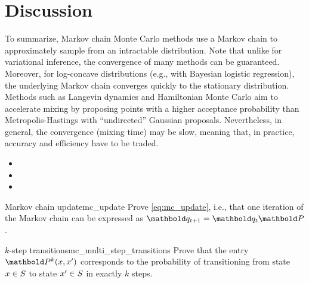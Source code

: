 \section*{Discussion}

To summarize, Markov chain Monte Carlo methods use a Markov chain to approximately sample from an intractable distribution.
Note that unlike for variational inference, the convergence of many methods can be guaranteed.
Moreover, for log-concave distributions (e.g., with Bayesian logistic regression), the underlying Markov chain converges quickly to the stationary distribution.
Methods such as Langevin dynamics and Hamiltonian Monte Carlo aim to accelerate mixing by proposing points with a higher acceptance probability than Metropolis-Hastings with ``undirected'' Gaussian proposals.
Nevertheless, in general, the convergence (mixing time) may be slow, meaning that, in practice, accuracy and efficiency have to be traded.

\begin{oreadings}
  \begin{itemize}
    \item {}
    \item {}
    \item {}
  \end{itemize}
\end{oreadings}

\excheading

\begin{nexercise}{Markov chain update}{mc_update}
  Prove \cref{eq:mc_update}, i.e., that one iteration of the Markov chain can be expressed as ${\vq_{t+1} = \vq_t \mP}$.
\end{nexercise}

\begin{nexercise}{$k$-step transitions}{mc_multi_step_transitions}
  Prove that the entry $\mP^k(x,x')$ corresponds to the probability of transitioning from state $x \in S$ to state $x' \in S$ in exactly $k$ steps.
\end{nexercise}

